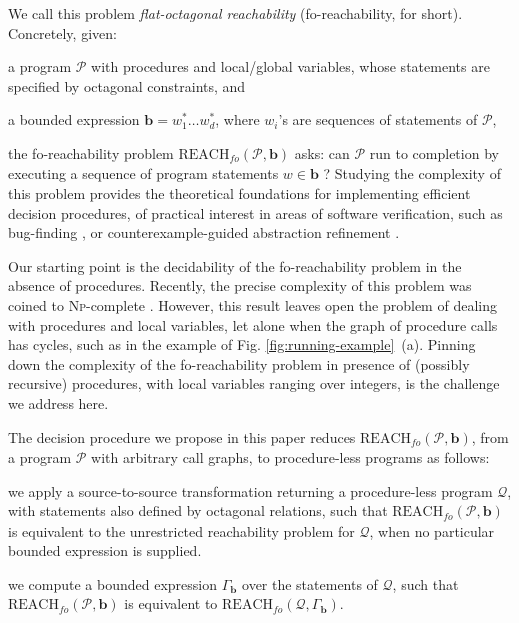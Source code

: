 \documentclass[final]{llncs}
\def\pat{{\mathbf{b}}}
\def\patg{{\Gamma_\pat}}
\def\foreach{\mathrm{REACH}_{\mathit{fo}}}
\begin{document}
We call this problem \emph{flat-octagonal reachability}
(fo-reachability, for short). Concretely, given:
\begin{inparaenum}
\item a program \(\mathcal{P}\) with procedures and local/global variables, 
      whose statements are specified by octagonal constraints, and
\item a bounded expression \(\pat=w_1^* \ldots w_d^*\), where \(w_i\)'s 
are sequences of statements of \(\mathcal{P}\),
\end{inparaenum}
the fo-reachability problem \(\foreach(\mathcal{P},\pat)\) asks:
can \(\mathcal{P}\) run to completion by executing a sequence of program
statements \(w \in \pat\) ?
Studying the complexity of this problem provides the theoretical
foundations for implementing efficient decision procedures, of
practical interest in areas of software verification, such as
bug-finding \cite{EsparzaG11}, or counterexample-guided abstraction
refinement \cite{KroeningLW13,HojjatIKKR12}.

Our starting point is the decidability of the fo-reachability problem
in the absence of procedures. Recently, the precise complexity of this
problem was coined to \textsc{Np}-complete \cite{bik14}. However, this
result leaves open the problem of dealing with procedures and local
variables, let alone when the graph of procedure calls has
cycles, such as in the example of
Fig. \ref{fig:running-example}~(a). Pinning down the complexity of the
fo-reachability problem in presence of (possibly recursive)
procedures, with local variables ranging over integers, is the
challenge we address here.

The decision procedure we propose in this paper reduces \(\foreach(\mathcal{P},\pat)\), from a program \(\mathcal{P}\)
with arbitrary call graphs, to procedure-less programs as follows:
\begin{compactenum}
\item we apply a source-to-source transformation returning a procedure-less
      program \(\mathcal{Q}\), with statements also defined by
      octagonal relations, such that \(\foreach(\mathcal{P},\pat)\) is
      equivalent to the unrestricted reachability problem
      for \(\mathcal{Q}\), when no particular bounded expression is
      supplied.

\item we compute a bounded expression \(\patg\) over the statements
      of \(\mathcal{Q}\), such that \(\foreach(\mathcal{P},\pat)\) is
      equivalent to \(\foreach(\mathcal{Q},\patg)\).
\end{compactenum}
\end{document}
